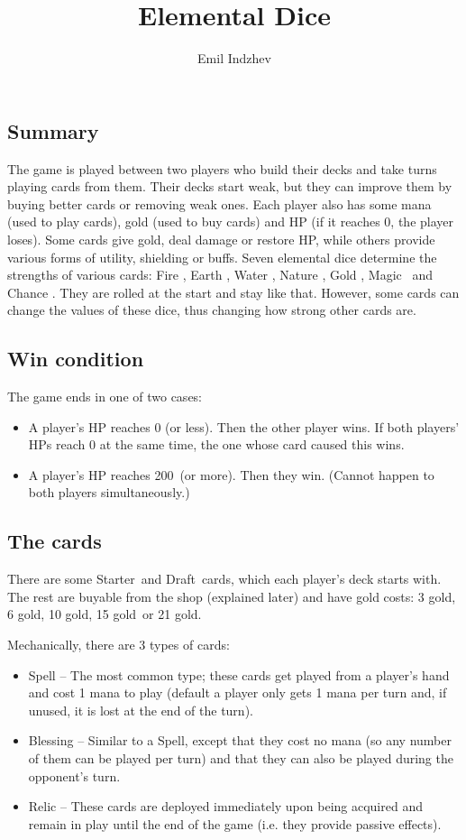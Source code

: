 \documentclass[dvipsnames,parskip,a4paper]{scrartcl}
\date{}
\title{Elemental Dice}
\author{Emil Indzhev}
\newcommand{\iconsize}{3.4mm}
\newcommand{\icondepth}{0.45mm}
\newcommand{\icon}[1]{\raisebox{-\icondepth}{\texttt{[image:  \#1 ]}}}
\newcommand{\fire}{\icon{icons/fire.png}}
\newcommand{\earth}{\icon{icons/earth.png}}
\newcommand{\water}{\icon{icons/water.png}}
\newcommand{\nature}{\icon{icons/nature.png}}
\newcommand{\magic}{\icon{icons/magic.png}}
\newcommand{\gold}{\icon{icons/gold.png}}
\newcommand{\chance}{\icon{icons/chance.png}}
\newcommand{\starter}{Starter}
\newcommand{\draft}{Draft}
\newcommand{\onecost}{3 gold}
\newcommand{\twocost}{6 gold}
\newcommand{\threecost}{10 gold}
\newcommand{\fourcost}{15 gold}
\newcommand{\fivecost}{21 gold}
\newcommand{\maxhp}{200}
\begin{document}

\subsection*{Summary}

The game is played between two players who build their decks and take turns playing cards from them. Their decks start weak, but they can improve them by buying better cards or removing weak ones. Each player also has some mana (used to play cards), gold (used to buy cards) and HP (if it reaches 0, the player loses). Some cards give gold, deal damage or restore HP, while others provide various forms of utility, shielding or buffs. Seven elemental dice determine the strengths of various cards: Fire \fire, Earth \earth, Water \water, Nature \nature, Gold \gold, Magic \magic \ and Chance \chance. They are rolled at the start and stay like that. However, some cards can change the values of these dice, thus changing how strong other cards are.

\subsection*{Win condition}

The game ends in one of two cases:

\begin{itemize}
\item A player's HP reaches 0 (or less). Then the other player wins. If both players' HPs reach 0 at the same time, the one whose card caused this wins.
\item A player's HP reaches \maxhp \ (or more). Then they win. (Cannot happen to both players simultaneously.)
\end{itemize}

\subsection*{The cards}

There are some \starter \ and \draft \ cards, which each player's deck starts with. The rest are buyable from the shop (explained later) and have gold costs: \onecost, \twocost, \threecost, \fourcost \ or \fivecost.

Mechanically, there are 3 types of cards:

\begin{itemize}
\item Spell -- The most common type; these cards get played from a player's hand and cost 1 mana to play (default a player only gets 1 mana per turn and, if unused, it is lost at the end of the turn).
\item Blessing -- Similar to a Spell, except that they cost no mana (so any number of them can be played per turn) and that they can also be played during the opponent's turn.
\item Relic -- These cards are deployed immediately upon being acquired and remain in play until the end of the game (i.e. they provide passive effects).
\end{itemize}
\end{document}
